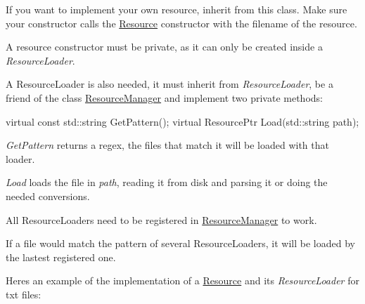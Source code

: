 If you want to implement your own resource, inherit from this class. Make sure your constructor calls the \hyperlink{classTarbora_1_1Resource}{Resource} constructor with the filename of the resource.

A resource constructor must be private, as it can only be created inside a {\itshape Resource\+Loader}.

A Resource\+Loader is also needed, it must inherit from {\itshape Resource\+Loader}, be a friend of the class \hyperlink{classTarbora_1_1ResourceManager}{Resource\+Manager} and implement two private methods\+:


\begin{DoxyCode}
\textcolor{keyword}{virtual} \textcolor{keyword}{const} std::string GetPattern();
\textcolor{keyword}{virtual} ResourcePtr Load(std::string path);
\end{DoxyCode}


{\itshape Get\+Pattern} returns a regex, the files that match it will be loaded with that loader.

{\itshape Load} loads the file in {\itshape path}, reading it from disk and parsing it or doing the needed conversions.

All Resource\+Loaders need to be registered in \hyperlink{classTarbora_1_1ResourceManager}{Resource\+Manager} to work.

If a file would match the pattern of several Resource\+Loaders, it will be loaded by the lastest registered one.

Here\textquotesingle{}s an example of the implementation of a \hyperlink{classTarbora_1_1Resource}{Resource} and its {\itshape Resource\+Loader} for txt files\+:


